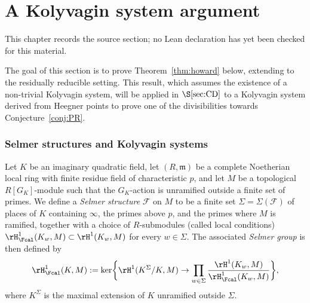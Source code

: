 \chapter{A Kolyvagin system argument}
\label{anticyclotomic-iwasawa-rational-elliptic-eisenstein-chapter-04}

\begin{remark}
\label{anticyclotomic-iwasawa-rational-elliptic-eisenstein-chapter-04-source}
This chapter records the source section; no Lean declaration has yet been checked for this material.
\notready
\end{remark}

\label{IMCIII}

The goal of this section is to prove Theorem~\ref{thm:howard} below, extending \cite[Thm.~2.2.10]{howard} to the residually reducible setting. This result, which assumes the existence of a non-trivial Kolyvagin system, will be applied in $\S\ref{sec:CD}$ to a Kolyvagin system derived from Heegner points to prove one of the divisibilities towards Conjecture~\ref{conj:PR}.


\subsection{Selmer structures and Kolyvagin systems}

Let $K$ be an imaginary quadratic field, let $(R,\mathfrak{m})$ be a complete Noetherian local ring with finite residue field of characteristic $p$, and let
$M$ be a topological $R[G_K]$-module such that the $G_K$-action is unramified outside a finite set of primes. We define a \emph{Selmer structure} $\mathcal{F}$ on $M$ to be a finite set $\Sigma=\Sigma(\mathcal{F})$ of places of $K$ containing $\infty$, the primes above $p$, and the primes where $M$ is ramified, together with a choice of $R$-submodules (called local conditions)
$\rH^1_{\Fcal}(K_w,M)\subset\rH^1(K_w,M)$ for every $w\in\Sigma$. The associated \emph{Selmer group} is then defined by
\[
\rH^1_{\Fcal}(K,M):={\rm ker}\biggl\{\rH^1(K^\Sigma/K,M)\rightarrow\prod_{w\in\Sigma}\frac{\rH^1(K_w,M)}{\rH^1_{\Fcal}(K_w,M)}\biggr\},
\]
where $K^\Sigma$ is the maximal extension of $K$ unramified outside $\Sigma$.

